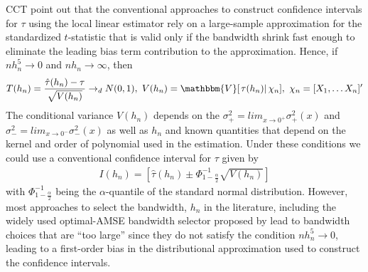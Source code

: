 \documentclass[12pt,fleqn]{article}
\begin{document}
CCT point out that the conventional approaches to construct 
confidence intervals for $\tau$ using the local linear estimator rely on a 
large-sample approximation for the standardized $t$-statistic that is valid only
if the bandwidth shrink fast enough to eliminate the leading bias term 
contribution to the approximation. Hence, if $nh_{n}^{5}\rightarrow0$ and 
$nh_{n}\rightarrow \infty$, then
 \begin{align}
  T(h_{n})=\frac{\hat{\tau}(h_{n})-\tau}{\sqrt{V(h_{n})}}\rightarrow_{d}N(0,1),
  \text{        }V(h_{n})=\mathbbm{V}[\left.\tau(h_{n})\right|\chi_{n}],
  \text{        }\chi_{n}=[X_{1}, \dots X_{n}]^{\prime}
 \end{align}
 The conditional variance $V(h_{n})$ depends on the $\sigma^{2}_{+}=
 lim_{x \rightarrow 0^{+}}\sigma^{2}_{+}(x)$ and $\sigma^{2}_{-}=
 lim_{x \rightarrow 0^{-}}\sigma^{2}_{-}(x)$ as well as $h_{n}$ and known 
 quantities that depend on the kernel and order of polynomial used in the 
 estimation. Under these conditions we could use a conventional confidence 
 interval for $\tau$ given by
 \begin{align}
  I(h_{n})=\left[\hat{\tau}(h_{n})\pm \Phi^{-1}_{1-\frac{\alpha}{2}}\sqrt{V(h_{n})} \right]
 \end{align}
with $\Phi^{-1}_{1-\frac{\alpha}{2}}$ being the $\alpha$-quantile of the 
standard normal distribution. However, most approaches to select the bandwidth, 
$h_{n}$ in the literature, including the widely used optimal-AMSE bandwidth 
selector proposed by \cite{IK} lead to bandwidth choices that are ``too large'' 
since they do not satisfy the condition $nh_{n}^{5}\rightarrow0$, leading to a 
first-order bias in the distributional approximation used to construct the 
confidence intervals.
\end{document}

